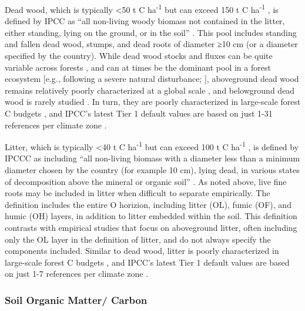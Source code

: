 \documentclass[, manuscript]{copernicus}
\begin{document}
Dead wood, which is typically \textless50 t C ha\textsuperscript{-1} but
can exceed 150 t C ha\textsuperscript{-1}
\citep{anderson-teixeira_carbon_2021}, is defined by IPCC as ``all
non-living woody biomass not contained in the litter, either standing,
lying on the ground, or in the soil''
\citep{ipcc_good_2003, ipcc_2006_2006}. This pool includes standing and
fallen dead wood, stumps, and dead roots of diameter ≥10 cm (or a
diameter specified by the country). While dead wood stocks and fluxes
can be quite variable across forests
\citep{anderson-teixeira_carbon_2021}, and can at times be the dominant
pool in a forest ecosystem {[}e.g., following a severe natural
disturbance; \citet{carmona_coarse_2002}{]}, aboveground dead wood
remains relatively poorly characterized at a global scale
\citep{anderson-teixeira_carbon_2021}, and belowground dead wood is
rarely studied \citep{merganicova_dadwood_2012}. In turn, they are
poorly characterized in large-scale forest C budgets
\citep{pan_large_2011, harris_global_2021}, and IPCC's latest Tier 1
default values are based on just 1-31 references per climate zone
\citep[Table 2.2 in][]{ipcc_2019_2019}.

Litter, which is typically \textless40 t C ha\textsuperscript{-1} but
can exceed 100 t C ha\textsuperscript{-1}
\citep{anderson-teixeira_carbon_2021}, is defined by IPCCC as including
``all non-living biomass with a diameter less than a minimum diameter
chosen by the country (for example 10 cm), lying dead, in various states
of decomposition above the mineral or organic soil''
\citep{ipcc_good_2003, ipcc_2006_2006}. As noted above, live fine roots
may be included in litter when difficult to separate empirically. The
definition includes the entire O horizion, including litter (OL), fumic
(OF), and humic (OH) layers, in addition to litter embedded within the
soil. This definition contrasts with empirical studies that focus on
aboveground litter, often including only the OL layer in the definition
of litter, and do not always specify the components included. Similar to
dead wood, litter is poorly characterized in large-scale forest C
budgets \citep{pan_large_2011, harris_global_2021}, and IPCC's latest
Tier 1 default values are based on just 1-7 references per climate zone
\citep[Table 2.2 in][]{ipcc_2019_2019}.

\subsubsection{Soil Organic Matter/ Carbon}
\end{document}
